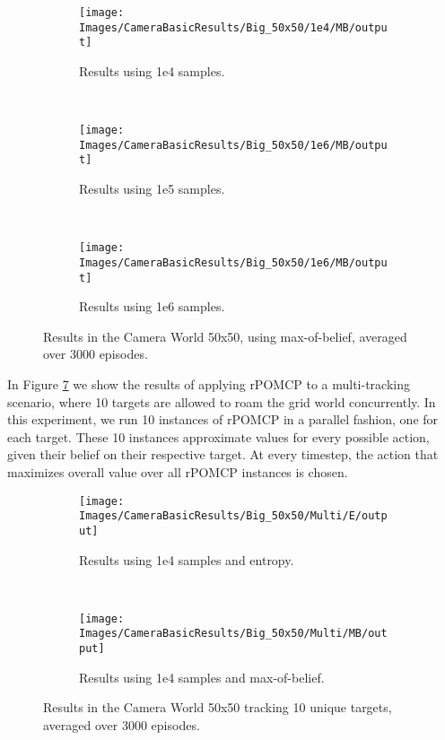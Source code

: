 \begin{figure}[ht]
        \centering
        \begin{subfigure}[t]{0.3\textwidth}
                \texttt{[image: Images/CameraBasicResults/Big\_50x50/1e4/MB/output]}
                \caption{Results using 1e4 samples.}
                \label{fig:cwb4mb}
        \end{subfigure}%
        ~ %
        \begin{subfigure}[t]{0.3\textwidth}
                \texttt{[image: Images/CameraBasicResults/Big\_50x50/1e6/MB/output]}
                \caption{Results using 1e5 samples.}
                \label{fig:cwb5mb}
        \end{subfigure}
        ~ %
        \begin{subfigure}[t]{0.3\textwidth}
                \texttt{[image: Images/CameraBasicResults/Big\_50x50/1e6/MB/output]}
                \caption{Results using 1e6 samples.}
                \label{fig:cwb6mb}
        \end{subfigure}
        \caption{Results in the Camera World 50x50, using max-of-belief, averaged over 3000 episodes.}\label{fig:cwbmb}
\end{figure}

In Figure \ref{fig:cwb10} we show the results of applying rPOMCP to a multi-tracking scenario, where
10 targets are allowed to roam the grid world concurrently. In this experiment, we run 10 instances
of rPOMCP in a parallel fashion, one for each target. These 10 instances approximate values for
every possible action, given their belief on their respective target. At every timestep, the action that
maximizes overall value over all rPOMCP instances is chosen.

\begin{figure}[ht!]
        \centering
        \begin{subfigure}[t]{0.5\textwidth}
                \texttt{[image: Images/CameraBasicResults/Big\_50x50/Multi/E/output]}
                \caption{Results using 1e4 samples and entropy.}
                \label{fig:cwb4e10}
        \end{subfigure}%
        ~ %
        \begin{subfigure}[t]{0.5\textwidth}
                \texttt{[image: Images/CameraBasicResults/Big\_50x50/Multi/MB/output]}
                \caption{Results using 1e4 samples and max-of-belief.}
                \label{fig:cwb5mb10}
        \end{subfigure}
        \caption{Results in the Camera World 50x50 tracking 10 unique targets, averaged over 3000 episodes.}\label{fig:cwb10}
\end{figure}

